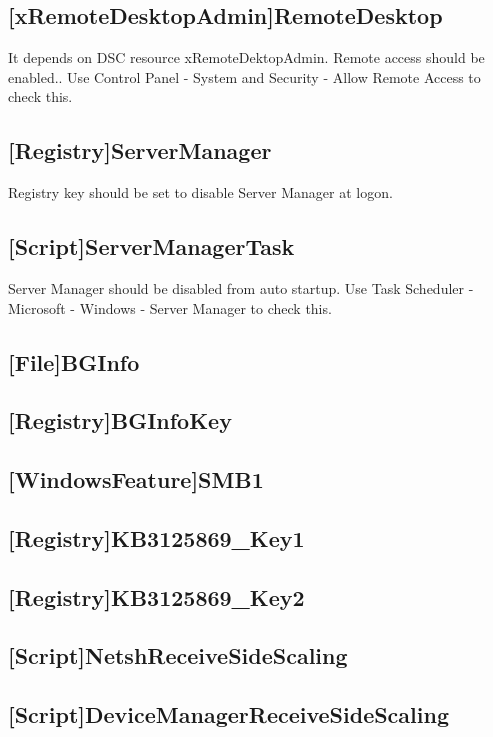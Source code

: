     \subsection{[xRemoteDesktopAdmin]RemoteDesktop}
      It depends on DSC resource xRemoteDektopAdmin. Remote access should be enabled.. Use Control Panel - System and Security - Allow Remote Access to check this.
    \subsection{[Registry]ServerManager}
      Registry key should be set to disable Server Manager at logon.
    \subsection{[Script]ServerManagerTask}
      Server Manager should be disabled from auto startup. Use Task Scheduler - Microsoft - Windows - Server Manager to check this.
    \subsection{[File]BGInfo}
    \subsection{[Registry]BGInfoKey}
    \subsection{[WindowsFeature]SMB1}
    \subsection{[Registry]KB3125869\_Key1}
    \subsection{[Registry]KB3125869\_Key2}
    \subsection{[Script]NetshReceiveSideScaling}
    \subsection{[Script]DeviceManagerReceiveSideScaling}


